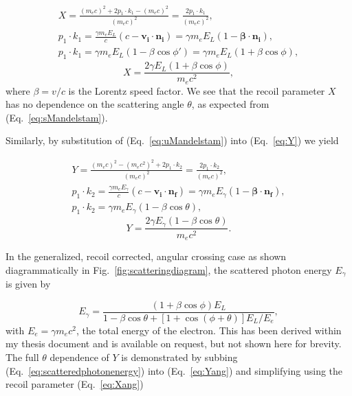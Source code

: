 \documentclass[10pt]{article}
\begin{document}
\begin{gather*}
X = \frac{\left(m_{e}c\right)^{2}+2p_{1}\cdot k_{1}-\left(m_{e}c\right)^{2}}{\left(m_{e}c\right)^{2}} = \frac{2p_{1}\cdot k_{1}}{\left(m_{e}c\right)^{2}}, \\
p_{1}\cdot k_{1} =\frac{\gamma m_{e}E_{L}}{c}\left(c-\bm{v_{i}}\cdot \bm{n_{i}}\right) = \gamma m_{e}E_{L}\left(1-\bm{\beta}\cdot\bm{n_{i}}\right), \\
p_{1}\cdot k_{1} = \gamma m_{e}E_{L}\left(1-\beta\cos\phi'\right) = \gamma m_{e}E_{L}\left(1+\beta\cos\phi\right),
\end{gather*}
\begin{equation}
X = \frac{2\gamma E_{L}\left(1+\beta\cos\phi\right)}{m_{e}c^{2}},
\label{eq:Xang}
\end{equation}
where $\beta = v/c$ is the Lorentz speed factor. We see that the recoil parameter $X$ has no dependence on the scattering angle $\theta$, as expected from (Eq.~\ref{eq:sMandelstam}). 

Similarly, by substitution of (Eq.~\ref{eq:uMandelstam}) into (Eq.~\ref{eq:Y}) we yield

\begin{gather*}
Y = \frac{\left(m_{e}c\right)^{2}-\left(m_{e}c^{2}\right)^{2}+2p_{1}\cdot k_{2}}{\left(m_{e}c\right)^{2}} = \frac{2p_{1}\cdot k_{2}}{\left(m_{e}c\right)^{2}}, \\
p_{1}\cdot k_{2} = \frac{\gamma m_{e}E_{\gamma}}{c}\left(c-\bm{v_{i}}\cdot\bm{n_{f}}\right) = \gamma m_{e}E_{\gamma}\left(1-\bm{\beta}\cdot\bm{n_{f}}\right), \\
p_{1}\cdot k_{2} = \gamma m_{e}E_{\gamma}\left(1-\beta\cos\theta\right),
\end{gather*}
\begin{equation}
Y = \frac{2\gamma E_{\gamma}\left(1-\beta\cos\theta\right)}{m_{e}c^{2}}.
\label{eq:Yang}
\end{equation}

In the generalized, recoil corrected, angular crossing case as shown diagrammatically in Fig.~\ref{fig:scatteringdiagram}, the scattered photon energy $E_{\gamma}$ is given by

\begin{equation}
E_{\gamma} = \frac{\left(1+\beta\cos\phi\right)E_{L}}{1-\beta\cos\theta+\left[1+\cos\left(\phi+\theta\right)\right]E_{L}/E_{e}},
\label{eq:scatteredphotonenergy}
\end{equation} 
with $E_{e} = \gamma m_{e}c^{2}$, the total energy of the electron. This has been derived within my thesis document and is available on request, but not shown here for brevity. The full $\theta$ dependence of $Y$ is demonstrated by subbing (Eq.~\ref{eq:scatteredphotonenergy}) into (Eq.~\ref{eq:Yang}) and simplifying using the recoil parameter (Eq.~\ref{eq:Xang})
\end{document}
